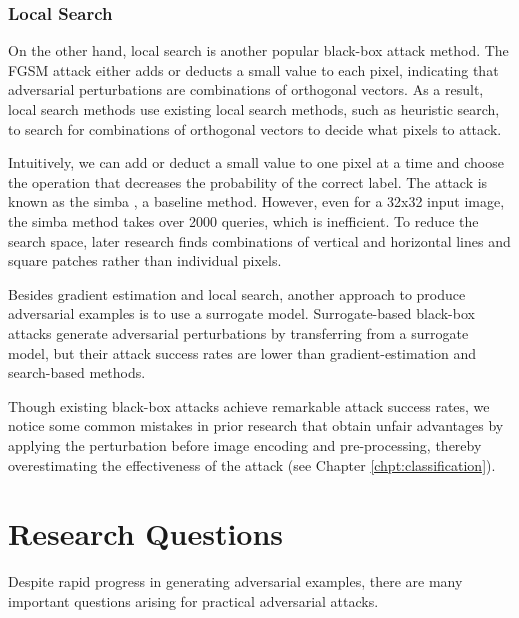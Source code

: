 
\subsubsection{Local Search}

On the other hand, local search is another popular black-box attack method. The FGSM attack either adds or deducts a small value to each pixel, indicating that adversarial perturbations are combinations of orthogonal vectors. As a result, local search methods use existing local search methods, such as heuristic search, to search for combinations of orthogonal vectors to decide what pixels to attack.

Intuitively, we can add or deduct a small value to one pixel at a time and choose the operation that decreases the probability of the correct label. The attack is known as the \acrfull{simba} \cite{guo2019simple}, a baseline method. However, even for a 32x32 input image, the \acrshort{simba} method takes over 2000 queries, which is inefficient. To reduce the search space, later research finds combinations of vertical and horizontal lines and square patches rather than individual pixels.

\clearpage

Besides gradient estimation and local search, another approach to produce adversarial examples is to use a surrogate model. Surrogate-based black-box attacks generate adversarial perturbations by transferring from a surrogate model, but their attack success rates are lower than gradient-estimation and search-based methods.

Though existing black-box attacks achieve remarkable attack success rates, we notice some common mistakes in prior research that obtain unfair advantages by applying the perturbation before image encoding and pre-processing, thereby overestimating the effectiveness of the attack (see Chapter \ref{chpt:classification}).

\section{Research Questions}
\label{sec:research_question}

Despite rapid progress in generating adversarial examples, there are many important questions arising for practical adversarial attacks.

